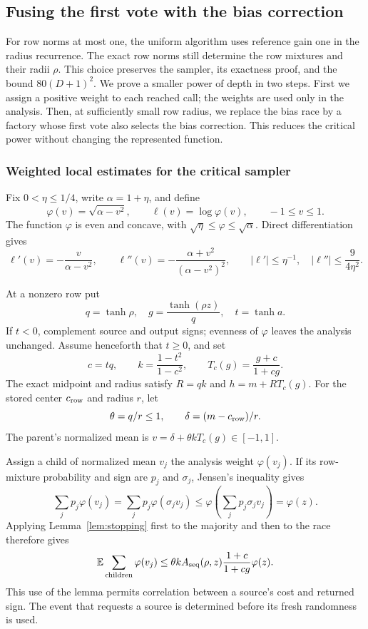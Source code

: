 \subsection{Fusing the first vote with the bias correction}
\label{app:fused}

For row norms at most one, the uniform algorithm uses reference gain
one in the radius recurrence. The exact row norms still determine the row
mixtures and their radii \(\rho\). This choice preserves the sampler,
its exactness proof, and the bound \(80(D+1)^2\). We prove a smaller
power of depth in two steps. First we assign a positive weight to each
reached call; the weights are used only in the analysis. Then, at
sufficiently small row radius, we replace the bias race by a factory
whose first vote also selects the bias correction. This reduces the
critical power without changing the represented function.

\subsubsection{Weighted local estimates for the critical sampler}
\label{app:potential}

Fix \(0<\eta\le1/4\), write \(\alpha=1+\eta\), and define
\[
\varphi(v)=\sqrt{\alpha-v^2},\qquad
\ell(v)=\log\varphi(v),\qquad -1\le v\le1.
\]
The function \(\varphi\) is even and concave, with
\(\sqrt\eta\le\varphi\le\sqrt\alpha\). Direct differentiation gives
\begin{equation}\label{eq:potentialderivatives}
\ell'(v)=-\frac{v}{\alpha-v^2},\qquad
\ell''(v)=-\frac{\alpha+v^2}{(\alpha-v^2)^2},\qquad
|\ell'|\le\eta^{-1},\quad
|\ell''|\le\frac9{4\eta^2}.
\end{equation}

At a nonzero row put
\[
q=\tanh\rho,\quad g=\frac{\tanh(\rho z)}q,\quad t=\tanh a.
\]
If \(t<0\), complement source and output signs; evenness of
\(\varphi\) leaves the analysis unchanged. Assume henceforth that
\(t\ge0\), and set
\[
c=tq,\qquad k=\frac{1-t^2}{1-c^2},\qquad
T_c(g)=\frac{g+c}{1+cg}.
\]
The exact midpoint and radius satisfy
\(R=qk\) and \(h=m+RT_c(g)\). For the stored center
\(c_{\rm row}\) and radius \(r\), let
\[
\theta=q/r\le1,\qquad \delta=(m-c_{\rm row})/r.
\]
The parent's normalized mean is
\(v=\delta+\theta kT_c(g)\in[-1,1]\).

Assign a child of normalized mean \(v_j\) the analysis weight
\(\varphi(v_j)\). If its row-mixture probability and sign are
\(p_j\) and \(\sigma_j\), Jensen's inequality gives
\[
\sum_jp_j\varphi(v_j)
=\sum_jp_j\varphi(\sigma_jv_j)
\le\varphi\!\left(\sum_jp_j\sigma_jv_j\right)=\varphi(z).
\]
Applying Lemma~\ref{lem:stopping} first to the majority and then
to the race therefore gives
\begin{equation}\label{eq:weightedchildren}
\mathbb E\sum_{\rm children}\varphi(v_j)
\le\theta kA_{\rm seq}(\rho,z)\frac{1+c}{1+cg}\varphi(z).
\end{equation}
This use of the lemma permits correlation between a source's cost
and returned sign. The event that requests a source is determined
before its fresh randomness is used.

